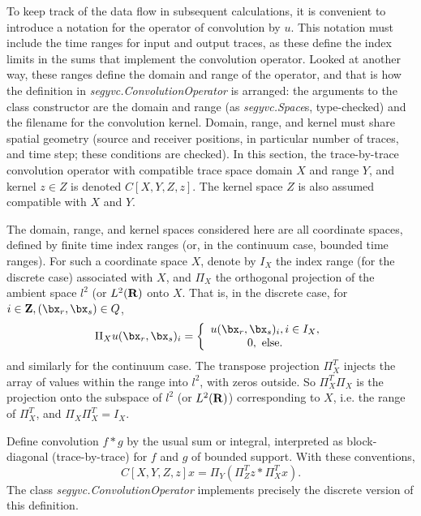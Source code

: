 To keep track of the data flow in subsequent calculations, it is convenient to introduce a notation for the operator of convolution by $u$. This notation must include the time ranges for input and output traces, as these define the index limits in the sums that implement the convolution operator. Looked at another way, these ranges define the domain and range of the operator, and that is how the definition in {\em segyvc.ConvolutionOperator} is arranged: the arguments to the class constructor are the domain and range (as {\em segyvc.Space}s, type-checked) and the filename for the convolution kernel. Domain, range, and kernel must share spatial geometry (source and receiver positions, in particular number of traces, and time step; these conditions are checked). In this section, the trace-by-trace convolution operator with compatible trace space domain $X$ and range $Y$, and kernel $z \in Z$ is denoted $C[X,Y,Z,z]$. 
The kernel space $Z$ is also assumed compatible with $X$ and $Y$.

The domain, range, and kernel spaces considered here are all coordinate spaces, defined by finite time index ranges (or, in the continuum case, bounded time ranges). For such a coordinate space $X$, denote by $I_X$ the index range (for the discrete case) associated with $X$, and $\Pi_X$ the orthogonal projection of the ambient space $l^2$ (or $L^2({\bf R})$ onto $X$. That is, in the discrete case, for $i \in {\bf Z}, (\bx_r,\bx_s) \in Q$,
\[
  \Pi_Xu(\bx_r,\bx_s)_i  =
  \left\{
    \begin{array}{c}
      u(\bx_r,\bx_s)_i, i \in I_X, \\
      0, \mbox{ else.}
    \end{array}
  \right.
\]  
and similarly for the continuum case. The transpose projection $\Pi_X^T$ injects the array of values within the range into $l^2$, with zeros outside. So $\Pi_X^T\Pi_X$ is the projection onto the subspace of $l^2$ (or $L^2({\bf R})$) corresponding to $X$, i.e. the range of $\Pi_X^T$, and $\Pi_X \Pi_X^T = I_X$.

Define convolution $f*g$ by the usual sum or integral, interpreted as block-diagonal (trace-by-trace) for  $f$ and $g$ of bounded support. With these conventions,
\begin{equation}
  \label{eqn:convdef}
C[X,Y,Z,z]x = \Pi_Y(\Pi_Z^T z * \Pi_X^T x).
\end{equation}
The class {\em segyvc.ConvolutionOperator} implements precisely the discrete version of this definition.


